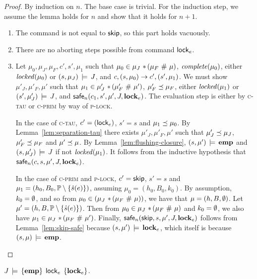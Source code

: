 \documentclass[11pt]{report}
\begin{document}
\begin{proof}
  By induction on $n$. The base case is trivial. For the induction step, we assume the lemma holds for $n$ and show that it holds for $n+1$.

    \begin{enumerate}
        \item The command is not equal to $\operatorname{\mathsf{skip}}$, so this part holds vacuously. 

        \item There are no aborting steps possible from command $\operatorname{\mathsf{lock}}_e$. 

        \item Let $\mu_0,\mu_J,\mu_F,c',s',\mu_1$ such that $\mu_0 \in \mu_J \operatorname{\,\ast\,} (\mu_F \operatorname{\,\#\,} \mu)$, $\mathit{complete}(\mu_0)$, either $\mathit{locked}(\mu_0)$ or $(s,\mu_J) \,\models\, J$, and $c,(s,\mu_0) \rightarrow c',(s',\mu_1)$. We must show $\mu'_J,\mu'_F,\mu'$ such that $\mu_1 \in \mu'_J \operatorname{\,\ast\,} (\mu'_F \operatorname{\,\#\,} \mu')$, $\mu'_F \preceq \mu_F$, either $\mathit{locked}(\mu_1)$ or $(s',\mu'_J) \,\models\, J$, and $\mathsf{safe}_{n}(c_1,s',\mu',J,\mathbf{lock}_{e})$. The evaluation step is either by \textsc{c-tau} or \textsc{c-prim} by way of \textsc{p-lock}. 

        In the case of \textsc{c-tau}, $c' = (\operatorname{\mathsf{lock}}_{e})$, $s' = s$ and $\mu_1 \preceq \mu_0$. By Lemma~\ref{lem:separation-tau} there exists $\mu'_J,\mu'_F,\mu'$ such that $\mu'_J \preceq \mu_J$, $\mu'_F \preceq \mu_F$ and $\mu' \preceq \mu$. By Lemma~\ref{lem:flushing-closure}, $(s,\mu') \,\models\, \mathbf{emp}$ and $(s,\mu'_J) \,\models\, J$ if not $\mathit{locked}(\mu_1)$. It follows from the inductive hypothesis that $\mathsf{safe}_{n}(c,s,\mu',J,\mathbf{lock}_{e})$. 

        In the case of \textsc{c-prim} and \textsc{p-lock}, $c' = \operatorname{\mathsf{skip}}$, $s' = s$ and $\mu_1 = (h_0,B_0,\mathbb{P} \setminus \left\lbrace \hat{s}(e) \right\rbrace)$, assuming $\mu_0 = (h_0,B_0,k_0)$. By assumption, $k_0 = \operatorname{\emptyset}$, and so from $\mu_0  \in (\mu_J \operatorname{\,\ast\,} (\mu_F \operatorname{\,\#\,} \mu))$, we have that $\mu = (h,B,\operatorname{\emptyset})$. Let $\mu' = (h,B,\mathbb{P} \setminus \left\lbrace \hat{s}(e) \right\rbrace)$. Then from $\mu_0 \in \mu_J \operatorname{\,\ast\,} (\mu_F \operatorname{\,\#\,} \mu)$ and $k_0 = \operatorname{\emptyset}$, we also have $\mu_1 \in \mu_J \operatorname{\,\ast\,} (\mu_F \operatorname{\,\#\,} \mu')$. Finally, $\mathsf{safe}_{n}(\operatorname{\mathsf{skip}},s,\mu',J,\mathbf{lock}_{e})$ follows from Lemma~\ref{lem:skip-safe} because $(s,\mu') \,\models\, \mathbf{lock}_{e}$, which itself is because $(s,\mu) \,\models\, \mathbf{emp}$.  

    \end{enumerate}
\end{proof}

\begin{lemma}
    \label{lem:lock-sound}
    $J\,\models\,\left\lbrace \mathbf{emp} \right\rbrace\;\operatorname{\mathsf{lock}}_{e}\;\left\lbrace \mathbf{lock}_{e} \right\rbrace$. 
\end{lemma} 
\end{document}

